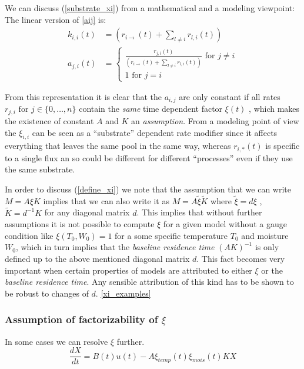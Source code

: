 \documentclass[journal abbreviation, manuscript]{copernicus}
\theoremstyle{definition}
\begin{document}
We can discuss (\ref{substrate_xi}) from a mathematical and a modeling viewpoint:
\newcommand{\kiit}{
      \left(
      r_{i \rightarrow } (t)
      + 
      \sum_{l \ne i} r_{l,i} (t)
      \right)
}
The linear version of \eqref{aij} is: 
\begin{align}
  k_{i,i}(t) &=\kiit \nonumber
  \\
  a_{j,i}(t) &=\left\{
  \begin{matrix}
  \frac{
    r_{j,i} (t)
  }{
    \kiit
  } \text{ for } j \ne i
  \\
  1 \text{ for } j=i
  \end{matrix}
  \right.
  \label{aij}
\end{align}

From this representation it is clear that the $a_{i,j}$ are only constant if all rates $r_{j,i} \text{ for } j \in \{0,\dots ,n \}$ contain the \emph{same} time dependent factor $\xi(t)$ , which makes the existence of constant $A$ and $K$ 
an \emph{assumption}.
From a modeling point of view the $\xi_{i,i}$ can be seen as a ``substrate'' dependent rate modifier since it affects everything that leaves the same pool in the same way, whereas $r_{i,*}(t)$ is specific to a single flux an so could be different for different ``processes'' even if they use the same substrate.


In order to discuss (\ref{define_xi}) we note that the assumption that we can write 
$M=A \xi K$ implies that we can also write it as $M=A \tilde{\xi} \tilde{K}$
where $\tilde{\xi}=d\xi$ , $\tilde{K}=d^{-1} K$ for any diagonal matrix $d$.
This implies that without further assumptions it is not possible to compute $\xi$
for a given model without a gauge condition like $\xi(T_0, W_0)=1$ for a some
specific temperature $T_0$ and moisture $W_0$, which in turn implies that the {\it baseline residence time } $(A K)^{-1}$
is only defined up to the above mentioned diagonal matrix $d$.
This fact becomes very important when certain properties of models are attributed to either $\xi$ or the {\it baseline residence time}.
Any sensible attribution of this kind has to be shown to be robust to changes of $d$.
\ref{xi_examples}

\subsubsection{Assumption of factorizability of $\xi$} 
In some cases we can resolve $\xi$ further.
$$
\frac{d X}{d t} = B(t)u(t) - A \xi_{temp}(t) \xi_{mois}(t) K X  
$$
\end{document}
